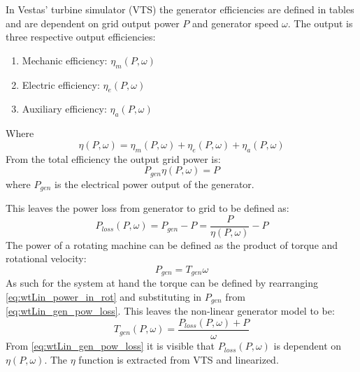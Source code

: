 In Vestas' turbine simulator (VTS) the generator efficiencies are defined in tables and are dependent on grid output power $ P $ and generator speed $ \omega $. The output is three respective output efficiencies: 
\begin{enumerate}
	\item Mechanic efficiency: $ \eta_m(P,\omega) $
	\item Electric efficiency: $ \eta_e(P,\omega) $
	\item Auxiliary efficiency: $ \eta_a(P,\omega) $
\end{enumerate}
Where 
\begin{equation}\label{eq:wtLin_gen_effi}
	\eta(P,\omega) = \eta_m(P,\omega) + \eta_e(P,\omega) + \eta_a(P,\omega)
\end{equation}
From the total efficiency the output grid power is:
\begin{equation}\label{eq:wtLin_gen_elec_pow}
	P_{gen} \eta(P,\omega) = P
\end{equation}
where $ P_{gen} $ is the electrical power output of the generator.

This leaves the power loss from generator to grid to be defined as:
\begin{equation} \label{eq:wtLin_gen_pow_loss}
	P_{loss}(P, \omega) = P_{gen} - P = \dfrac{P}{\eta(P, \omega)} - P
\end{equation}
The power of a rotating machine can be defined as the product of torque and rotational velocity:
\begin{equation}\label{eq:wtLin_power_in_rot}
	P_{gen} = T_{gen} \omega
\end{equation}
As such for the system at hand the torque can be defined by rearranging \cref{eq:wtLin_power_in_rot} and substituting in $ P_{gen} $ from \cref{eq:wtLin_gen_pow_loss}. This leaves the non-linear generator model to be:
\begin{equation}\label{key}
	T_{gen}(P, \omega) = \dfrac{P_{loss}(P, \omega) + P}{\omega}
\end{equation}
From \cref{eq:wtLin_gen_pow_loss} it is visible that $ P_{loss}(P,\omega) $ is dependent on $ \eta(P, \omega) $. The $ \eta $ function is extracted from VTS and linearized.

